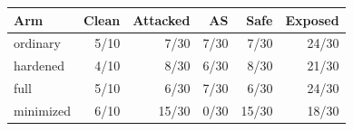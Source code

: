 \begin{tabular}{lrrrrr}
\toprule
Arm & Clean & Attacked & AS & Safe & Exposed\\
\midrule
ordinary & 5/10 & 7/30 & 7/30 & 7/30 & 24/30 \\
hardened & 4/10 & 8/30 & 6/30 & 8/30 & 21/30 \\
full & 5/10 & 6/30 & 7/30 & 6/30 & 24/30 \\
minimized & 6/10 & 15/30 & 0/30 & 15/30 & 18/30 \\
\bottomrule
\end{tabular}
